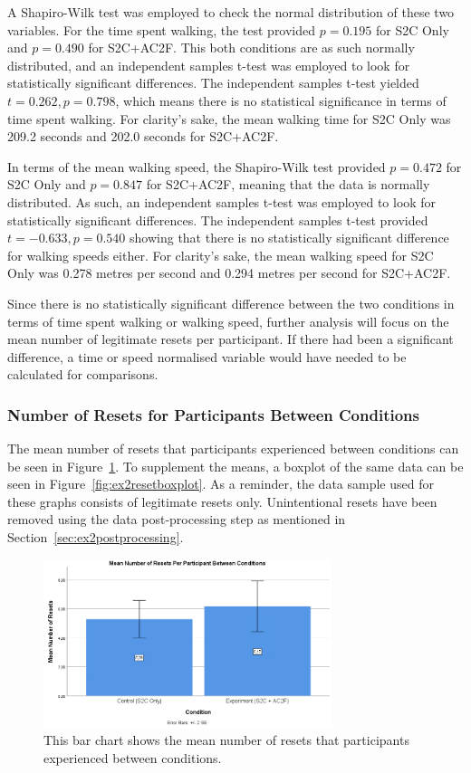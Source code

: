 A Shapiro-Wilk test was employed to check the normal distribution of these two variables. For the time spent walking, the test provided $p = 0.195$ for S2C Only and $p = 0.490$ for S2C+AC2F. This both conditions are as such normally distributed, and an independent samples t-test was employed to look for statistically significant differences. The independent samples t-test yielded $t = 0.262, p = 0.798$, which means there is no statistical significance in terms of time spent walking. For clarity's sake, the mean walking time for S2C Only was 209.2 seconds and 202.0 seconds for S2C+AC2F. 

In terms of the mean walking speed, the Shapiro-Wilk test provided $p = 0.472$ for S2C Only and $p = 0.847$ for S2C+AC2F, meaning that the data is normally distributed. As such, an independent samples t-test was employed to look for statistically significant differences. The independent samples t-test provided $t = -0.633, p = 0.540$ showing that there is no statistically significant difference for walking speeds either. For clarity's sake, the mean walking speed for S2C Only was 0.278 metres per second and 0.294 metres per second for S2C+AC2F.

Since there is no statistically significant difference between the two conditions in terms of time spent walking or walking speed, further analysis will focus on the mean number of legitimate resets per participant. If there had been a significant difference, a time or speed normalised variable would have needed to be calculated for comparisons. 

\subsubsection{Number of Resets for Participants Between Conditions}
The mean number of resets that participants experienced between conditions can be seen in Figure~\ref{fig:ex2resetMeans}. To supplement the means, a boxplot of the same data can be seen in Figure~\ref{fig:ex2resetboxplot}. As a reminder, the data sample used for these graphs consists of legitimate resets only. Unintentional resets have been removed using the data post-processing step as mentioned in Section~\ref{sec:ex2postprocessing}.

\begin{figure}[tbph]
    \centering
    \includegraphics[width=0.75\textwidth]{figures/graphs/ResetMeans.png}
    \caption[Mean Number of Resets Between Conditions for Experiment 2]{This bar chart shows the mean number of resets that participants experienced between conditions.}
    \label{fig:ex2resetMeans}
\end{figure}

